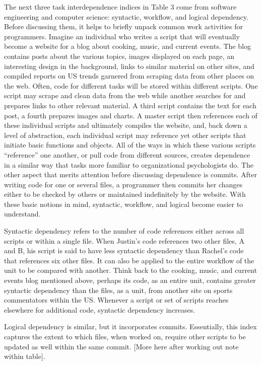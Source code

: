 \documentclass[english,,man]{apa6}
\theoremstyle{definition}
\theoremstyle{definition}
\theoremstyle{definition}
\theoremstyle{remark}
\begin{document}
The next three task interdependence indices in Table 3 come from
software engineering and computer science: syntactic, workflow, and
logical dependency. Before discussing them, it helps to briefly unpack
common work activities for programmers. Imagine an individual who writes
a script that will eventually become a website for a blog about cooking,
music, and current events. The blog contains posts about the various
topics, images displayed on each page, an interesting design in the
background, links to similar material on other sites, and compiled
reports on US trends garnered from scraping data from other places on
the web. Often, code for different tasks will be stored within different
scripts. One script may scrape and clean data from the web while another
searches for and prepares links to other relevant material. A third
script contains the text for each post, a fourth prepares images and
charts. A master script then references each of these individual scripts
and ultimately compiles the website, and, back down a level of
abstraction, each individual script may reference yet other scripts that
initiate basic functions and objects. All of the ways in which these
various scripts \enquote{reference} one another, or pull code from
different sources, creates dependence in a similar way that tasks more
familiar to organizational psychologists do. The other aspect that
merits attention before discussing dependence is commits. After writing
code for one or several files, a programmer then commits her changes
either to be checked by others or maintained indefinitely by the
website. With these basic notions in mind, syntactic, workflow, and
logical become easier to understand.

Syntactic dependency refers to the number of code references either
across all scripts or within a single file. When Justin's code
references two other files, A and B, his script is said to have less
syntactic dependency than Rachel's code that references six other files.
It can also be applied to the entire workflow of the unit to be compared
with another. Think back to the cooking, music, and current events blog
mentioned above, perhaps its code, as an entire unit, contains greater
syntactic dependency than the files, as a unit, from another site on
sports commentators within the US. Whenever a script or set of scripts
reaches elsewhere for additional code, syntactic dependency increases.

Logical dependency is similar, but it incorporates commits. Essentially,
this index captures the extent to which files, when worked on, require
other scripts to be updated as well within the same commit. {[}More here
after working out note within table{]}.
\end{document}
